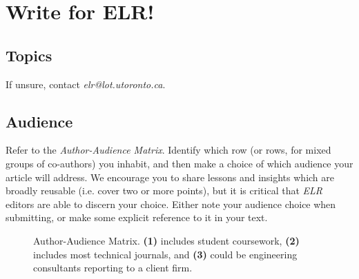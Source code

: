 \chapter*{Write for ELR!}

\section{Topics}
If unsure, contact \emph{elr@lot.utoronto.ca}.

\section*{Audience}
Refer to the \emph{Author-Audience Matrix}.
Identify which row (or rows, for mixed groups of co-authors) you inhabit, and then make a choice of which audience your article will address.
We encourage you to share lessons and insights which are broadly reusable (i.e. cover two or more points), but it is critical that \emph{ELR} editors are able to discern your choice.
Either note your audience choice when submitting, or make some explicit reference to it in your text.
\begin{figure}
\centering
{}
\caption{Author-Audience Matrix. \textbf{(1)} includes student coursework, \textbf{(2)} includes most technical journals, and \textbf{(3)} could be engineering consultants reporting to a client firm.}
\end{figure}

